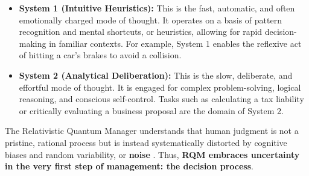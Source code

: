 \documentclass{article}
\begin{document}
\begin{itemize}
    \item \textbf{System 1 (Intuitive Heuristics):} This is the fast, automatic, and often emotionally charged mode of thought. It operates on a basis of pattern recognition and mental shortcuts, or heuristics, allowing for rapid decision-making in familiar contexts. For example, System 1 enables the reflexive act of hitting a car's brakes to avoid a collision.
    \item \textbf{System 2 (Analytical Deliberation):} This is the slow, deliberate, and effortful mode of thought. It is engaged for complex problem-solving, logical reasoning, and conscious self-control. Tasks such as calculating a tax liability or critically evaluating a business proposal are the domain of System 2.
\end{itemize}


The Relativistic Quantum Manager understands that human judgment is not a pristine, rational process but is instead systematically distorted by cognitive biases and random variability, or \textbf{noise} \cite{kahneman2021noise}. Thus, \textbf{RQM embraces uncertainty in the very first step of management: the decision process}.
\end{document}
